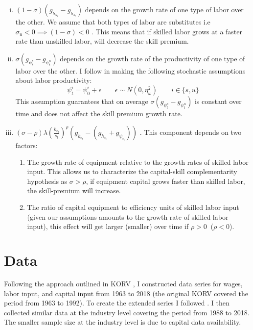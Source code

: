 \documentclass[12pt]{article}
\begin{document}
\begin{enumerate}[(i)]
 \item $(1-\sigma)(g_{h_{u_t}}-g_{h_{s_t}})$ depends on the growth rate of one type of labor over the other. We assume that both types of labor are substitutes i.e $\sigma_u < 0 \implies (1-\sigma) < 0$ . This means that if skilled labor grows at a faster rate than unskilled labor, will decrease the skill premium.
 \item $\sigma\left(g_{\psi^s_t}-g_{\psi^u_t}\right)$ depends on the growth rate of the productivity of one type of labor over the other. I follow \citep{krusell2000capital} in making the following stochastic assumptions about labor productivity:
 \begin{equation}\label{eq:stochastic_labor_productivity}
 \psi^i_t = \psi^i_0 + \epsilon \qquad \epsilon \sim N(0, \eta_\omega^2) \qquad i\in\{s,u\}
 \end{equation}
 This assumption guarantees that on average $\sigma (g_{\psi^s_t}-g_{\psi^u_t} )$ is constant over time and does not affect the skill premium growth rate. 
 \item $(\sigma-\rho) \lambda\left(\frac{k_{e_t}}{s_{t}}\right)^{\rho}\left(g_{k_{e_t}}-(g_{h_{s_t}}+g_{\psi_{s_t}})\right)$ . This component depends on two factors:
 \begin{enumerate}
 \item The growth rate of equipment relative to the growth rates of skilled labor input. This allows us to characterize the capital-skill complementarity hypothesis as $\sigma > \rho$, if equipment capital grows faster than skilled labor, the skill-premium will increase.
 \item The ratio of capital equipment to efficiency units of skilled labor input (given our assumptions amounts to the growth rate of skilled labor input), this effect will get larger (smaller) over time if $\rho > 0\:$ ($\rho < 0$). 
 \end{enumerate}
\end{enumerate}


\section{Data}\label{sec:data}
Following the approach outlined in KORV \citet{krusell2000capital}, I constructed data series for wages, labor input, and capital input from 1963 to 2018 (the original KORV covered the period from 1963 to 1992). To create the extended series I followed \citet{ohanian2021revisiting}. I then collected similar data at the industry level covering the period from 1988 to 2018. The smaller sample size at the industry level is due to capital data availability.
\end{document}
